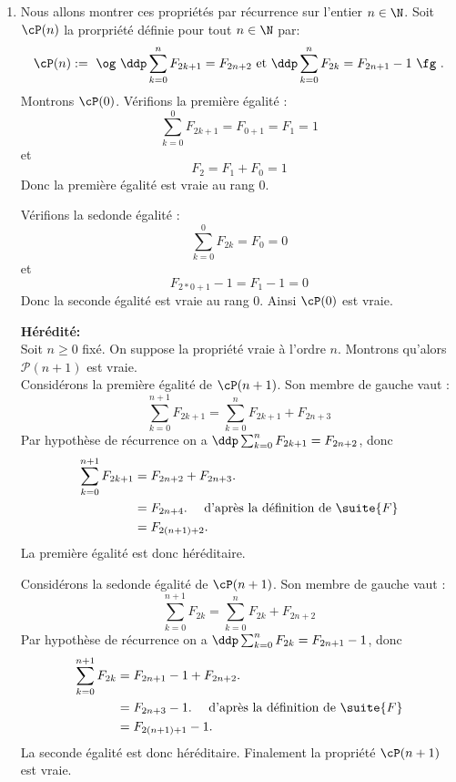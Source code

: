 \begin{correction}
\begin{enumerate}
\item Nous allons montrer ces propriétés par récurrence sur l'entier $n\in \N$. 
Soit $\cP(n)$ la prorpriété définie pour tout $n\in\N$ par:
$$\cP(n) := \text{ \og }\ddp  \sum_{k=0}^n F_{2k+1} =F_{2n+2} \text{ 
et } \ddp \sum_{k=0}^n F_{2k} =F_{2n+1}-1 \text{ \fg }.$$
Montrons  $\cP(0)$. Vérifions la première égalité : 
$$\sum_{k=0}^0 F_{2k+1} =F_{0+1}=F_1=1$$
et 
$$F_2 =F_1+F_0 =1$$
Donc la première égalité est vraie au rang $0$. 

Vérifions la sedonde égalité : 
$$\sum_{k=0}^0 F_{2k} =F_{0}=0$$
et 
$$F_{2*0+1}-1 =F_1-1=0$$
Donc la seconde égalité est vraie au rang $0$. 
Ainsi $\cP(0)$ est vraie. 


 \textbf{H\'er\'edit\'e:}\\
Soit $n\geq 0$ fix\'e. On suppose la propri\'et\'e vraie \`a l'ordre $n$. Montrons qu'alors $\mathcal{P}(n+1)$ est vraie.\\

Considérons la première égalité de $\cP(n+1)$. Son membre de gauche vaut : 
\begin{equation*}
 \sum_{k=0}^{n+1} F_{2k+1}=  \sum_{k=0}^n F_{2k+1} +F_{2n+3}
\end{equation*}
Par hypothèse de récurrence on a $ \ddp \sum_{k=0}^n F_{2k+1} = F_{2n+2}$, donc 
\begin{align*}
 \sum_{k=0}^{n+1} F_{2k+1} & =F_{2n+2}+F_{2n+3}.\\
								& = F_{2n+4}.\quad \text{ d'après la définition de $\suite{F}$}\\
								& = F_{2(n+1)+2}.\\
\end{align*}
La première égalité est donc héréditaire. 


Considérons la sedonde égalité de $\cP(n+1)$. Son membre de gauche vaut : 
\begin{equation*}
 \sum_{k=0}^{n+1} F_{2k}=  \sum_{k=0}^n F_{2k} +F_{2n+2}
\end{equation*}
Par hypothèse de récurrence on a $ \ddp \sum_{k=0}^n F_{2k} = F_{2n+1}-1$, donc 
\begin{align*}
 \sum_{k=0}^{n+1} F_{2k} & =F_{2n+1}-1+F_{2n+2}.\\
								& = F_{2n+3}-1.\quad \text{ d'après la définition de $\suite{F}$}\\
								& = F_{2(n+1)+1}-1.\\
\end{align*}
La seconde égalité est donc héréditaire. Finalement la propriété $\cP(n+1)$ est vraie. 



\end{enumerate}
\end{correction}
